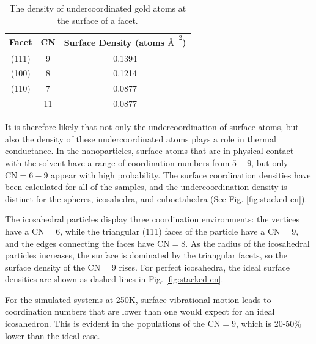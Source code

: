 \begin{table}[h]
\centering
\caption{The density of undercoordinated gold atoms at the surface of a facet.  
\label{tab:au-den}}
\renewcommand*{\arraystretch}{2}
\begin{tabular}{ ccc }
\toprule
Facet & CN & Surface Density (atoms $\text{\AA}^{-2}$)\\
\midrule
        (111) & 9  & 0.1394 \\
\midrule
        (100) & 8  & 0.1214 \\
\midrule
        (110) & 7  & 0.0877 \\
              & 11 & 0.0877 \\
\bottomrule
\end{tabular}
\end{table}

It is therefore likely that not only the undercoordination of surface
atoms, but also the density of these undercoordinated atoms plays a
role in thermal conductance. In the nanoparticles, surface atoms that
are in physical contact with the solvent have a range of coordination
numbers from $5 - 9$, but only $\text{CN} = 6 - 9$ appear with high
probability.  The surface coordination densities have been calculated
for all of the samples, and the undercoordination density is distinct
for the spheres, icosahedra, and cuboctahedra (See
Fig. \ref{fig:stacked-cn}).

The icosahedral particles display three coordination environments: the
vertices have a $\text{CN} = 6$, while the triangular (111) faces of
the particle have a $\text{CN} = 9$, and the edges connecting the
faces have $\text{CN} = 8$.  As the radius of the icosahedral
particles increases, the surface is dominated by the triangular
facets, so the surface density of the $\text{CN} = 9$ rises.  For
perfect icosahedra, the ideal surface densities are shown as dashed
lines in Fig. \ref{fig:stacked-cn}.

For the simulated systems at 250K, surface vibrational motion leads to
coordination numbers that are lower than one would expect for an ideal
icosahedron. This is evident in the populations of the $\text{CN}= 9$,
which is 20-50\% lower than the ideal case.

